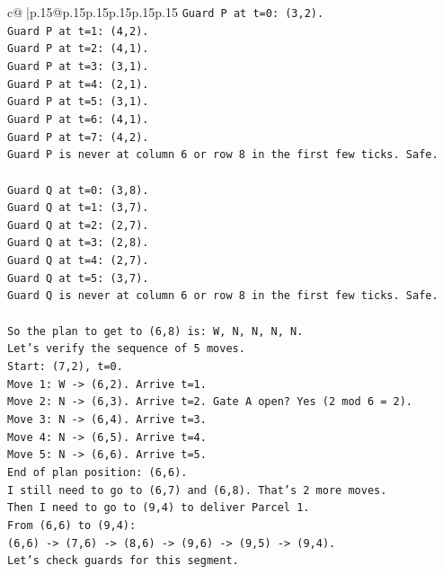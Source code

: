 \documentclass{article}
\begin{document}
{\begin{supertabular}{c@{$\;$}|p{.15\linewidth}@{}p{.15\linewidth}p{.15\linewidth}p{.15\linewidth}p{.15\linewidth}p{.15\linewidth}}
{{{\texttt{Guard P at t=0: (3,2).} \\
\texttt{Guard P at t=1: (4,2).} \\
\texttt{Guard P at t=2: (4,1).} \\
\texttt{Guard P at t=3: (3,1).} \\
\texttt{Guard P at t=4: (2,1).} \\
\texttt{Guard P at t=5: (3,1).} \\
\texttt{Guard P at t=6: (4,1).} \\
\texttt{Guard P at t=7: (4,2).} \\
\texttt{Guard P is never at column 6 or row 8 in the first few ticks. Safe.} \\
\\ 
\texttt{Guard Q at t=0: (3,8).} \\
\texttt{Guard Q at t=1: (3,7).} \\
\texttt{Guard Q at t=2: (2,7).} \\
\texttt{Guard Q at t=3: (2,8).} \\
\texttt{Guard Q at t=4: (2,7).} \\
\texttt{Guard Q at t=5: (3,7).} \\
\texttt{Guard Q is never at column 6 or row 8 in the first few ticks. Safe.} \\
\\ 
\texttt{So the plan to get to (6,8) is: W, N, N, N, N.} \\
\texttt{Let's verify the sequence of 5 moves.} \\
\texttt{Start: (7,2), t=0.} \\
\texttt{Move 1: W {-}> (6,2). Arrive t=1.} \\
\texttt{Move 2: N {-}> (6,3). Arrive t=2. Gate A open? Yes (2 mod 6 = 2).} \\
\texttt{Move 3: N {-}> (6,4). Arrive t=3.} \\
\texttt{Move 4: N {-}> (6,5). Arrive t=4.} \\
\texttt{Move 5: N {-}> (6,6). Arrive t=5.} \\
\texttt{End of plan position: (6,6).} \\
\texttt{I still need to go to (6,7) and (6,8). That's 2 more moves.} \\
\texttt{Then I need to go to (9,4) to deliver Parcel 1.} \\
\texttt{From (6,6) to (9,4):} \\
\texttt{(6,6) {-}> (7,6) {-}> (8,6) {-}> (9,6) {-}> (9,5) {-}> (9,4).} \\
\texttt{Let's check guards for this segment.} \\
}}}
\end{supertabular}}
\end{document}
